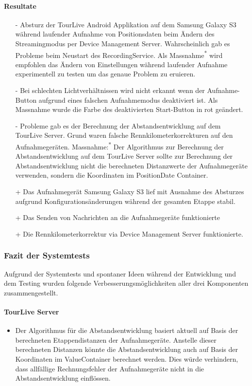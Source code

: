 \paragraph*{Resultate}
\begin{itemize}
	\item[-] Absturz der TourLive Android Applikation auf dem Samsung Galaxy S3 während laufender Aufnahme von Positionsdaten beim Ändern des Streamingmodus per Device Management Server. Wahrscheinlich gab es Probleme beim Neustart des RecordingService. Als Massnahme\textsuperscript{*} wird empfohlen das Ändern von Einstellungen während laufender Aufnahme experimentell zu testen um das genaue Problem zu eruieren. 
	\item[-] Bei schlechten Lichtverhältnissen wird nicht erkannt wenn der Aufnahme-Button aufgrund eines falschen Aufnahmemodus deaktiviert ist. Als Massnahme wurde die Farbe des deaktivierten Start-Button in rot geändert.
	\item[-] Probleme gab es der Berechnung der Abstandsentwicklung auf dem TourLive Server. Grund waren falsche Rennkilometerkorrekturen auf den Aufnahmegeräten. Massnahme:\textsuperscript{*} Der Algorithmus zur Berechnung der Abstandsentwicklung auf dem TourLive Server sollte zur Berechnung der Abstandsentwicklung nicht die berechneten Distanzwerte der Aufnahmegeräte verwenden, sondern die Koordinaten im PositionDate Container.
	\item[+] Das Aufnahmegerät Samsung Galaxy S3 lief mit Ausnahme des Absturzes aufgrund Konfigurationsänderungen während der gesamten Etappe stabil. 
	\item[+] Das Senden von Nachrichten an die Aufnahmegeräte funktionierte
	\item[+] Die Rennkilometerkorrektur via Device Management Server funktionierte.
\end{itemize}

\subsubsection{Fazit der Systemtests}
\label{sec:fazitsystemtests}

Aufgrund der Systemtests und spontaner Ideen während der Entwicklung und dem Testing wurden folgende Verbesserungsmöglichkeiten aller drei Komponenten zusammengestellt.
\paragraph{TourLive Server}
\begin{itemize}
 \item Der Algorithmus für die Abstandsentwicklung basiert aktuell auf Basis der berechneten Etappendistanzen der Aufnahmegeräte. Anstelle dieser berechneten Distanzen könnte die Abstandsentwicklung auch auf Basis der Koordinaten im ValueContainer berechnet werden. Dies würde verhindern, dass allfällige Rechnungsfehler der Aufnahmegeräte nicht in die Abstandsentwicklung einflössen.
\end{itemize}

